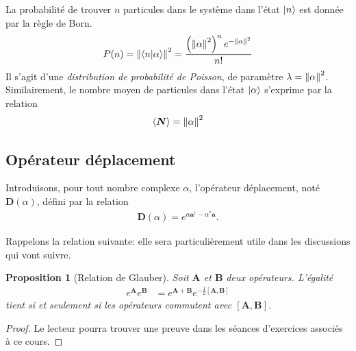 \documentclass[11pt,oneside,a4paper]{article}
\newtheorem{property}[theorem]{Proposition}
\begin{document}
La probabilité de trouver $n$ particules dans le système dans l'état $\ket{n}$ est donnée par la règle de Born.
\begin{align*}
  P(n) = \norm{\braket{n}{\alpha}}^2 = \frac{\left(\norm{\alpha}^{2}\right)^ne^{-\norm{\alpha}^2}}{n!}
\end{align*}
Il s'agit d'une \emph{distribution de probabilité de Poisson}, de paramètre $\lambda = \norm{\alpha}^2$.\\

Similairement, le nombre moyen de particules dans l'état $\ket{\alpha}$ s'exprime par la relation
\begin{align}
  \expval{\bm{N}} = \norm{\alpha}^2\label{eq:mean N}
\end{align}

\subsection{Opérateur déplacement} \label{opérateur déplacement}
Introduisons, pour tout nombre complexe $\alpha$, l'opérateur déplacement, noté $\bm{D}(\alpha)$, défini par la relation
\begin{align}
  \label{eq:operateur deplacement}
  \bm{D}(\alpha) = e^{\alpha \bm{a}^\dagger-\alpha^*\bm{a}}.
\end{align}

Rappelons la relation suivante: elle sera particulièrement utile dans les discussions qui vont suivre.

\begin{property}[Relation de Glauber]
  \label{prop Glauber}
  Soit $\bm{A}$ et $\bm{B}$ deux opérateurs. L'égalité
  \begin{align}
    \label{Glauber}
    e^{\bm{A}}e^{\bm{B}} &= e^{\bm{A}+\bm{B}}e^{-\frac{1}{2}\left[\bm{A},\bm{B}\right]}
  \end{align}
  tient si et seulement si les opérateurs commutent avec $\left[\bm{A},\bm{B}\right]$.
\end{property}

\begin{proof}
  Le lecteur pourra trouver une preuve dans les séances d'exercices associés à ce cours.
\end{proof}
\end{document}
